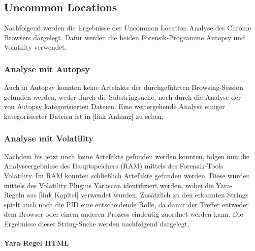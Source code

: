 \subsection*{Uncommon Locations}

Nachfolgend werden die Ergebnisse der Uncommon Location Analyse des Chrome Browsers dargelegt. Dafür werden die beiden Forensik-Programme Autopsy und Volatility verwendet.

\subsubsection*{Analyse mit Autopsy}

Auch in Autopsy konnten keine Artefakte der durchgeführten Browsing-Session gefunden werden, weder durch die Substringsuche, noch durch die Analyse der von Autopsy kategorisierten Dateien. Eine weitergehende Analyse einiger kategorisierter Dateien ist in [link Anhang] zu sehen.

\subsubsection*{Analyse mit Volatility}

Nachdem bis jetzt noch keine Artefakte gefunden werden konnten, folgen nun die Analyseergebnisse des Hauptspeichers (RAM) mittels des Forensik-Tools Volatility. Im RAM konnten schließlich Artefakte gefunden werden. Diese wurden mittels des Volatility Plugins Yarascan identifiziert werden, wobei die Yara-Regeln aus [link Kapitel] verwendet wurden. Zusätzlich zu den erkannten Strings spielt auch noch die PID eine entscheidende Rolle, da damit der Treffer entweder dem Browser oder einem anderen Prozess eindeutig zuordnet werden kann. Die Ergebnisse dieser String-Suche werden nachfolgend dargelegt.

\paragraph*{Yara-Regel \glqq{}HTML\grqq{}}

